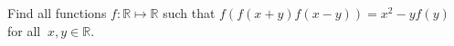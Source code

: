 Find all functions $ f : \mathbb{R} \mapsto \mathbb{R}$ such that $f(f(x+y)f(x-y))=x^2-yf(y)$ for all $ \ x,y \in \mathbb{R}.$